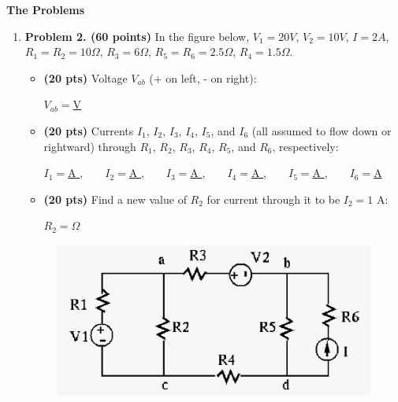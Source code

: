 \documentclass[11pt]{article}
\begin{document}
{\bf The Problems}
\begin{enumerate}

\item {\bf Problem 2. (60 points)} 
  In the figure below, $V_1=20V$, $V_2=10V$, $I=2A$, $R_1=R_2=10\Omega$, 
  $R_3=6\Omega$, $R_5=R_6=2.5\Omega$, $R_4=1.5\Omega$.
  \begin{itemize}
    \item {\bf (20 pts)} 
      Voltage $V_{ab}$ (+ on left, - on right):

      $V_{ab}=$\underline{\hspace{2cm}V}

  \end{itemize}
    
  \begin{itemize}
  \item {\bf (20 pts)} 
    Currents $I_1$, $I_2$, $I_3$, $I_4$, $I_5$, and $I_6$ (all assumed
    to flow down or rightward) through $R_1$, $R_2$, $R_3$, $R_4$, $R_5$, 
    and $R_6$, respectively:    

    $I_1=$\underline{\hspace{2cm}A },$\;\;\;\;\;\;$
    $I_2=$\underline{\hspace{2cm}A },$\;\;\;\;\;\;$
    $I_3=$\underline{\hspace{2cm}A },$\;\;\;\;\;\;$
    $I_4=$\underline{\hspace{2cm}A },$\;\;\;\;\;\;$
    $I_5=$\underline{\hspace{2cm}A },$\;\;\;\;\;\;$
    $I_6=$\underline{\hspace{2cm}A }

  \item {\bf (20 pts)}
    Find a new value of $R_2$ for current through it to be $I_2=1$ A:

    $R_2=$\underline{\hspace{2cm}$\Omega$}
  \end{itemize}

\begin{figure}[h!]
\centering
\includegraphics[scale=0.5]{midterm12015f.eps}
\end{figure}


\end{enumerate}
\end{document}
